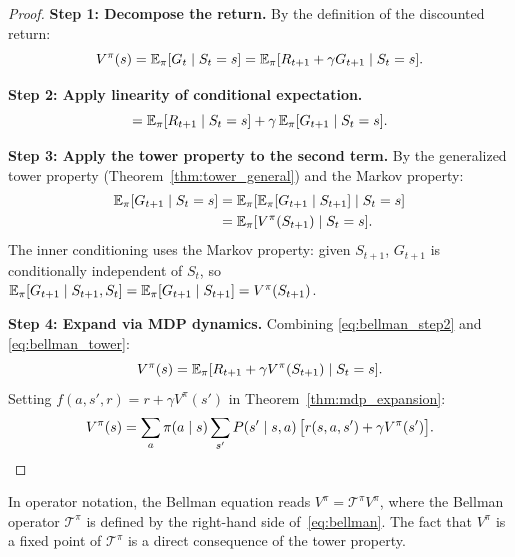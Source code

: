 \documentclass[11pt,a4paper]{article}
\begin{document}
\begin{proof}
\textbf{Step 1: Decompose the return.}
By the definition of the discounted return:
\begin{equation}
  V^\pi(s) = \mathbb{E}_\pi[G_t \mid S_t = s]
  = \mathbb{E}_\pi[R_{t+1} + \gamma G_{t+1} \mid S_t = s].
  \label{eq:bellman_step1}
\end{equation}

\textbf{Step 2: Apply linearity of conditional expectation.}
\begin{equation}
  = \mathbb{E}_\pi[R_{t+1} \mid S_t = s]
    + \gamma\, \mathbb{E}_\pi[G_{t+1} \mid S_t = s].
  \label{eq:bellman_step2}
\end{equation}

\textbf{Step 3: Apply the tower property to the second term.}
By the generalized tower property
(Theorem~\ref{thm:tower_general}) and the Markov property:
\begin{align}
  \mathbb{E}_\pi[G_{t+1} \mid S_t = s]
  &= \mathbb{E}_\pi\!\left[
    \mathbb{E}_\pi[G_{t+1} \mid S_{t+1}]
    \;\middle|\; S_t = s\right]
  \nonumber\\
  &= \mathbb{E}_\pi[V^\pi(S_{t+1}) \mid S_t = s].
  \label{eq:bellman_tower}
\end{align}
The inner conditioning uses the Markov property: given $S_{t+1}$,
$G_{t+1}$ is conditionally independent of $S_t$, so
$\mathbb{E}_\pi[G_{t+1} \mid S_{t+1}, S_t] = \mathbb{E}_\pi[G_{t+1} \mid S_{t+1}]
= V^\pi(S_{t+1})$.

\textbf{Step 4: Expand via MDP dynamics.}
Combining \eqref{eq:bellman_step2} and \eqref{eq:bellman_tower}:
\begin{equation}
  V^\pi(s) = \mathbb{E}_\pi[R_{t+1} + \gamma V^\pi(S_{t+1})
    \mid S_t = s].
\end{equation}
Setting $f(a, s', r) = r + \gamma V^\pi(s')$ in
Theorem~\ref{thm:mdp_expansion}:
\begin{equation}
  V^\pi(s) = \sum_a \pi(a \mid s) \sum_{s'}
  P(s' \mid s, a)\, \bigl[r(s,a,s') + \gamma V^\pi(s')\bigr].
  \qedhere
\end{equation}
\end{proof}

\begin{remark}
In operator notation, the Bellman equation reads
$V^\pi = \mathcal{T}^\pi V^\pi$, where the Bellman operator
$\mathcal{T}^\pi$ is defined by the right-hand side
of~\eqref{eq:bellman}.  The fact that $V^\pi$ is a fixed point
of $\mathcal{T}^\pi$ is a direct consequence of the tower
property.
\end{remark}
\end{document}
